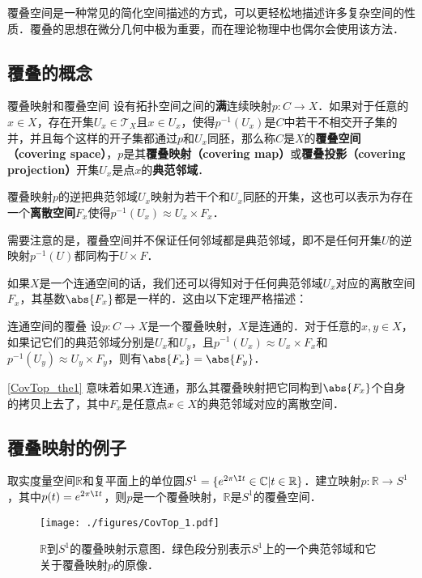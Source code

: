 

覆叠空间是一种常见的简化空间描述的方式，可以更轻松地描述许多复杂空间的性质．覆叠的思想在微分几何中极为重要，而在理论物理中也偶尔会使用该方法．

\subsection{覆叠的概念}
\begin{definition}{覆叠映射和覆叠空间}\label{CovTop_def1}
设有拓扑空间之间的\textbf{满}连续映射$p:C\rightarrow X$．如果对于任意的$x\in X$，存在开集$U_x\in\mathcal{T}_X$且$x\in U_x$，使得$p^{-1}(U_x)$是$C$中若干不相交开子集的并，并且每个这样的开子集都通过$p$和$U_x$同胚，那么称$C$是$X$的\textbf{覆叠空间（covering space）}，$p$是其\textbf{覆叠映射（covering map）}或\textbf{覆叠投影（covering projection）}开集$U_x$是点$x$的\textbf{典范邻域}．
\end{definition} 

覆叠映射$p$的逆把典范邻域$U_x$映射为若干个和$U_x$同胚的开集，这也可以表示为存在一个\textbf{离散空间}$F_x$使得$p^{-1}(U_x)\approx U_x\times F_x$．

需要注意的是，覆叠空间并不保证任何邻域都是典范邻域，即不是任何开集$U$的逆映射$p^{-1}(U)$都同构于$U\times F$．

如果$X$是一个连通空间的话，我们还可以得知对于任何典范邻域$U_x$对应的离散空间$F_x$，其基数$\abs{F_x}$都是一样的．这由以下定理严格描述：

\begin{theorem}{连通空间的覆叠}\label{CovTop_the1}
设$p:C\rightarrow X$是一个覆叠映射，$X$是连通的．对于任意的$x, y\in X$，如果记它们的典范邻域分别是$U_x$和$U_y$，且$p^{-1}(U_x)\approx U_x\times F_x$和$p^{-1}(U_y)\approx U_y\times F_y$，则有$\abs{F_x}=\abs{F_y}$．
\end{theorem}

\autoref{CovTop_the1} 意味着如果$X$连通，那么其覆叠映射把它同构到$\abs{F_x}$个自身的拷贝上去了，其中$F_x$是任意点$x\in X$的典范邻域对应的离散空间．

\subsection{覆叠映射的例子}

\begin{example}{}
取实度量空间$\mathbb{R}$和复平面上的单位圆$S^1=\{e^{2\pi\I t}\in\mathbb{C}|t\in\mathbb{R}\}$．建立映射$p:\mathbb{R}\rightarrow S^1$，其中$p(t)=e^{2\pi\I t}$，则$p$是一个覆叠映射，$\mathbb{R}$是$S^1$的覆叠空间．

\begin{figure}[ht]
\centering
\texttt{[image: ./figures/CovTop\_1.pdf]}
\caption{$\mathbb{R}$到$S^1$的覆叠映射示意图．绿色段分别表示$S^1$上的一个典范邻域和它关于覆叠映射$p$的原像．} \label{CovTop_fig1}
\end{figure}
\end{example}
